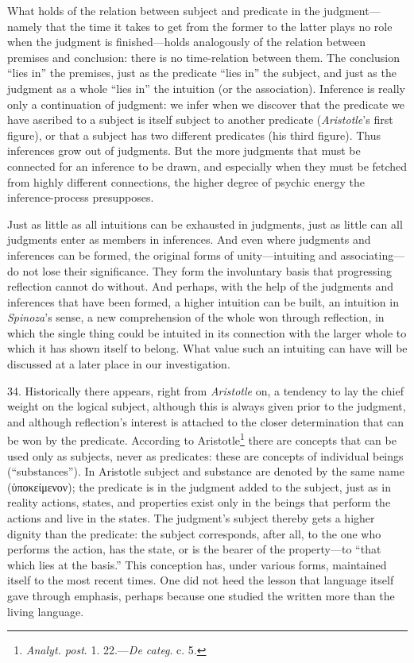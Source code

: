 \documentclass[12pt,a4paper]{book}
\newcommand{\opage}[1]{\marginnote{\footnotesize\textit{[#1]}}}
\begin{document}
What holds of the relation between subject and predicate in the
judgment---namely that the time it takes to get from the former to the
latter plays no role when the judgment is finished---holds analogously of
the relation between premises and conclusion: there is no time-relation
between them. The conclusion ``lies in'' the premises, just as the
predicate ``lies in'' the subject, and just as the judgment as a whole
``lies in'' the intuition (or the association). Inference is really only a
continuation of judgment: we infer when we discover that the predicate we
have ascribed to a subject is itself subject to another predicate
(\emph{Aristotle}'s first figure), or that a subject has two different
predicates (his third figure). Thus inferences grow out of judgments. But
the more judgments that must be connected for an inference to be drawn, and
especially when they must be fetched from highly different connections, the
higher degree of psychic energy the inference-process presupposes.

Just as little as all intuitions can be exhausted in judgments, just as
little can all judgments enter as members in inferences. And even where
judgments and inferences can be formed, the original forms of
unity---intuiting and associating---do not lose their significance. They
form the involuntary basis that progressing reflection cannot do without.
And perhaps, with the help of the judgments and inferences that have been
formed, a higher intuition can be built, an \opage{96}intuition in \emph{Spinoza}'s
sense, a new comprehension of the whole won through reflection, in which
the single thing could be intuited in its connection with the larger whole
to which it has shown itself to belong. What value such an intuiting can
have will be discussed at a later place in our investigation.

34. Historically there appears, right from \emph{Aristotle} on, a tendency
to lay the chief weight on the logical subject, although this is always
given prior to the judgment, and although reflection's interest is
attached to the closer determination that can be won by the predicate.
According to Aristotle\footnote{\emph{Analyt. post}. 1. 22.---\emph{De
categ}. c. 5.} there are concepts that can be used only as subjects, never
as predicates: these are concepts of individual beings (``substances'').
In Aristotle subject and substance are denoted by the same name
(ὑποκείμενον); the predicate is in the judgment added to the subject, just
as in reality actions, states, and properties exist only in the beings
that perform the actions and live in the states. The judgment's subject
thereby gets a higher dignity than the predicate: the subject corresponds,
after all, to the one who performs the action, has the state, or is the
bearer of the property---to ``that which lies at the basis.'' This
conception has, under various forms, maintained itself to the most recent
times. One did not heed the lesson that language itself gave through
emphasis, perhaps because one studied the written more than the living
language.
\end{document}
